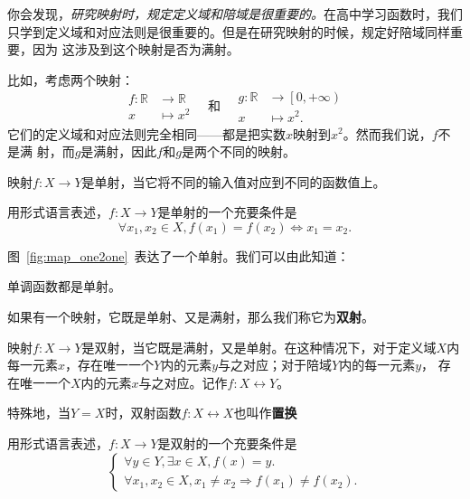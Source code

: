你会发现，\emph{研究映射时，规定定义域和陪域是很重要的。}在高中学习函数时，我们
只学到定义域和对应法则是很重要的。但是在研究映射的时候，规定好陪域同样重要，因为
这涉及到这个映射是否为满射。

比如，考虑两个映射：
\[
    \begin{aligned}
        f: \mathbb{R} &\to \mathbb{R}\\
        x &\mapsto x^2
    \end{aligned}
    \quad \text{和}\quad
    \begin{aligned}
        g: \mathbb{R} &\to \left[ 0,+\infty \right)\\
        x &\mapsto x^2.
    \end{aligned}
\]
它们的定义域和对应法则完全相同——都是把实数$x$映射到$x^2$。然而我们说，$f$不是满
射，而$g$是满射，因此$f$和$g$是两个不同的映射。

\begin{rawdef}[单射]
    映射$f: X\to Y$是单射，当它将不同的输入值对应到不同的函数值上。

    用形式语言表述，$f: X\to Y$是单射的一个充要条件是
    \[
        \forall x_{1},x_{2} \in X, f(x_{1})=f(x_{2}) \Leftrightarrow x_{1}=x_{2}
        .
    \]
\end{rawdef}

图~\ref{fig:map_one2one}~表达了一个单射。我们可以由此知道：
\begin{rawthm}\label{thm:monotone_one2one}
    单调函数都是单射。
\end{rawthm}

如果有一个映射，它既是单射、又是满射，那么我们称它为\textbf{双射}。

\begin{rawdef}[双射]
    映射$f:X\to Y$是双射，当它既是满射，又是单射。在这种情况下，对于定义域$X$内
    每一元素$x$，存在唯一一个$Y$内的元素$y$与之对应；对于陪域$Y$内的每一元素$y$，
    存在唯一一个$X$内的元素$x$与之对应。记作$f: X\leftrightarrow Y$。

    特殊地，当$Y=X$时，双射函数$f: X\leftrightarrow X$也叫作\textbf{置换}

    用形式语言表述，$f: X\to Y$是双射的一个充要条件是
    \[
        \left\{
        \begin{matrix}
            \forall y \in Y, \exists x \in X, f(x)=y.\\
            \forall x_{1},x_{2}\in X, x_{1}\neq x_{2}\Rightarrow f(x_{1})\neq f(x_{2}).
        \end{matrix}
        \right.
    \]
\end{rawdef}

